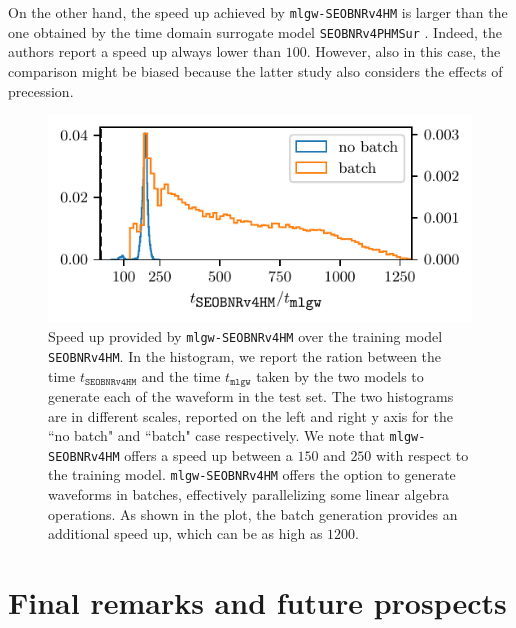 \documentclass[twocolumn,showpacs,preprintnumbers,nofootinbib,prd,
superscriptaddress,10pt]{revtex4-2}
\begin{document}
On the other hand, the speed up achieved by \texttt{mlgw-SEOBNRv4HM} is larger than the one obtained by the time domain surrogate model \texttt{SEOBNRv4PHMSur} \cite{Gadre:2022sed}. Indeed, the authors report a speed up always lower than $100$. However, also in this case, the comparison might be biased because the latter study also considers the effects of precession.

\begin{figure}[t]
	\centering
	\includegraphics[scale = 1]{timing}
	\caption{Speed up provided by \texttt{mlgw-SEOBNRv4HM} over the training model \texttt{SEOBNRv4HM}.
	In the histogram, we report the ration between the time $t_\texttt{SEOBNRv4HM}$ and the time $t_\texttt{mlgw}$ taken by the two models to generate each of the waveform in the test set.
	The two histograms are in different scales, reported on the left and right y axis for the ``no batch" and ``batch" case respectively.
	We note that \texttt{mlgw-SEOBNRv4HM} offers a speed up between a $150$ and $250$ with respect to the training model.
	\texttt{mlgw-SEOBNRv4HM} offers the option to generate waveforms in batches, effectively parallelizing some linear algebra operations. As shown in the plot, the batch generation provides an additional speed up, which can be as high as $1200$.
	}
	\label{fig:timing_hist}
\end{figure}


\section{Final remarks and future prospects}
\label{sec:end}
\end{document}
